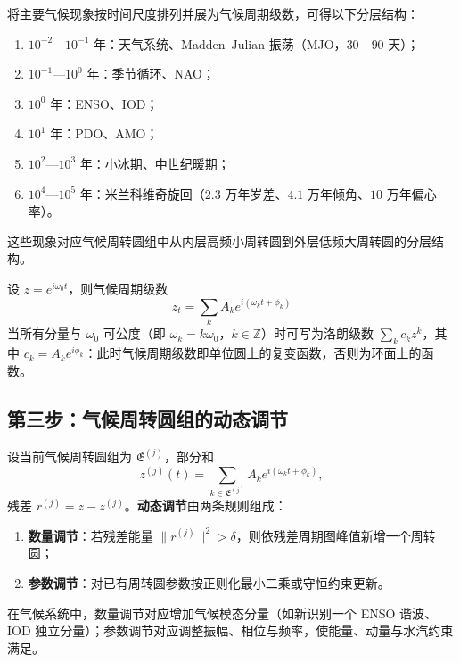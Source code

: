 \begin{example}[气候现象的周期谱级数]\label{ex:climate_period_spectrum_series}
将主要气候现象按时间尺度排列并展为气候周期级数，可得以下分层结构：
\begin{enumerate}[label=(\roman*)]
    \item $10^{-2}$—$10^{-1}$ 年：天气系统、Madden–Julian 振荡（MJO，$30$—$90$ 天）；
    \item $10^{-1}$—$10^0$ 年：季节循环、NAO；
    \item $10^0$ 年：ENSO、IOD；
    \item $10^1$ 年：PDO、AMO；
    \item $10^2$—$10^3$ 年：小冰期、中世纪暖期；
    \item $10^4$—$10^5$ 年：米兰科维奇旋回（$2.3$ 万年岁差、$4.1$ 万年倾角、$10$ 万年偏心率）。
\end{enumerate}
这些现象对应气候周转圆组中从内层高频小周转圆到外层低频大周转圆的分层结构。
\end{example}

\begin{remark}[周期级数即复变函数]\label{rem:climate_series_complex}
设 $z=e^{i\omega_0t}$，则气候周期级数
\[
z_t=\sum_k A_k e^{i(\omega_k t+\phi_k)}
\]
当所有分量与 $\omega_0$ 可公度（即 $\omega_k=k\omega_0$，$k\in\mathbb Z$）时可写为洛朗级数 $\sum_k c_k z^k$，其中 $c_k=A_k e^{i\phi_k}$：此时气候周期级数即单位圆上的复变函数，否则为环面上的函数。
\end{remark}

\subsection{第三步：气候周转圆组的动态调节}

\begin{definition}[气候周转圆组的动态调节]\label{def:climate_adaptive_adjustment}
设当前气候周转圆组为 $\mathfrak E^{(j)}$，部分和
\[
z^{(j)}(t)=\sum_{k\in\mathfrak E^{(j)}}A_k e^{i(\omega_k t+\phi_k)},
\]
残差 $r^{(j)}=z-z^{(j)}$。\textbf{动态调节}由两条规则组成：
\begin{enumerate}[label=(\roman*)]
    \item \textbf{数量调节}：若残差能量 $\|r^{(j)}\|^2>\delta$，则依残差周期图峰值新增一个周转圆；
    \item \textbf{参数调节}：对已有周转圆参数按正则化最小二乘或守恒约束更新。
\end{enumerate}
在气候系统中，数量调节对应增加气候模态分量（如新识别一个 ENSO 谐波、IOD 独立分量）；参数调节对应调整振幅、相位与频率，使能量、动量与水汽约束满足。
\end{definition}

